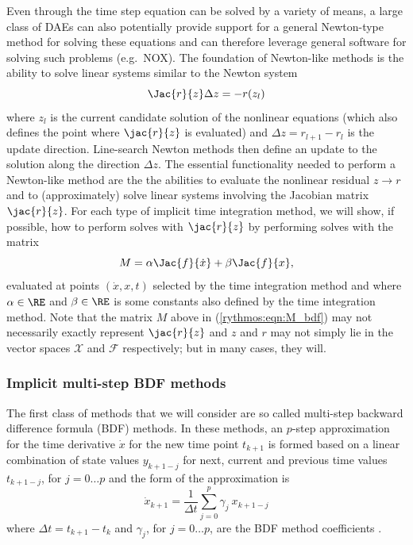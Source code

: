 \documentclass[pdf,ps2pdf,11pt]{SANDreport}
\begin{document}
Even through the time step equation can be solved by a variety of means, a
large class of DAEs can also potentially provide support for a general
Newton-type method for solving these equations and can therefore leverage
general software for solving such problems (e.g.\ NOX).  The foundation of
Newton-like methods is the ability to solve linear systems similar to the
Newton system
%
\begin{equation}
\Jac{r}{z} \Delta z = - r(z_l)
\end{equation}
%
where $z_l$ is the current candidate solution of the nonlinear equations
(which also defines the point where $\jac{r}{z}$ is evaluated) and $\Delta z =
r_{l+1} - r_l$ is the update direction.  Line-search Newton methods then
define an update to the solution along the direction $\Delta z$.  The
essential functionality needed to perform a Newton-like method are the the
abilities to evaluate the nonlinear residual $z {}\rightarrow r$ and to
(approximately) solve linear systems involving the Jacobian matrix
$\jac{r}{z}$.  For each type of implicit time integration method, we will
show, if possible, how to perform solves with $\jac{r}{z}$ by performing
solves with the matrix
%
\begin{equation}
M = \alpha \Jac{f}{\dot{x}} + \beta \Jac{f}{x},
\label{rythmos:eqn:M}
\end{equation}
%
evaluated at points $(\dot{x},x,t)$ selected by the time integration method
and where $\alpha\in\RE$ and $\beta\in\RE$ is some constants also defined by
the time integration method.  Note that the matrix $M$ above in
(\ref{rythmos:eqn:M_bdf}) may not necessarily exactly represent $\jac{r}{z}$
and $z$ and $r$ may not simply lie in the vector spaces $\mathcal{X}$ and
$\mathcal{F}$ respectively; but in many cases, they will.

\subsubsection{Implicit multi-step BDF methods}

The first class of methods that we will consider are so called multi-step
backward difference formula (BDF) methods.  In these methods, an $p$-step
approximation for the time derivative $\dot{x}$ for the new time point
$t_{k+1}$ is formed based on a linear combination of state values $y_{k+1-j}$
for next, current and previous time values $t_{k+1-j}$, for $j = 0 {}\ldots p$
and the form of the approximation is
%
\begin{equation}
\dot{x}_{k+1} = \frac{1}{\Delta t} \sum_{j=0}^{p} \gamma_j \: x_{k+1-j}
\label{rythmos:eqn:bdf_x_dot}
\end{equation}
%
where $\Delta t = t_{k+1} - t_k$ and $\gamma_j$, for $j=0 {}\ldots p$, are the
BDF method coefficients \cite{AscherPetzold}.
\end{document}
